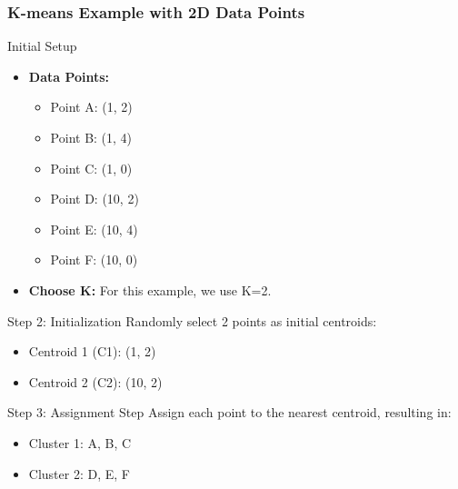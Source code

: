 \documentclass[aspectratio=169]{beamer}
\begin{document}
\begin{frame}[fragile]
    \frametitle{K-means Example with 2D Data Points}
    \begin{block}{Initial Setup}
        \begin{itemize}
            \item \textbf{Data Points:}
                \begin{itemize}
                    \item Point A: (1, 2)
                    \item Point B: (1, 4)
                    \item Point C: (1, 0)
                    \item Point D: (10, 2)
                    \item Point E: (10, 4)
                    \item Point F: (10, 0)
                \end{itemize}
            \item \textbf{Choose K:} For this example, we use K=2.
        \end{itemize}
    \end{block}
    
    \begin{block}{Step 2: Initialization}
        Randomly select 2 points as initial centroids:
        \begin{itemize}
            \item Centroid 1 (C1): (1, 2)
            \item Centroid 2 (C2): (10, 2)
        \end{itemize}
    \end{block}

    \begin{block}{Step 3: Assignment Step}
        Assign each point to the nearest centroid, resulting in:
        \begin{itemize}
            \item Cluster 1: {A, B, C}
            \item Cluster 2: {D, E, F}
        \end{itemize}
    \end{block}
\end{frame}
\end{document}
